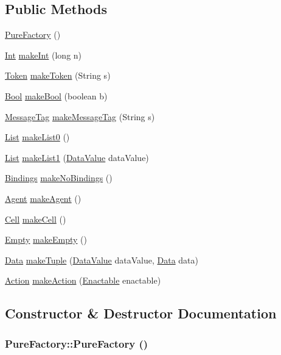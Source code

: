 \subsection*{Public Methods}
\begin{CompactItemize}
\item 
\hyperlink{classPureFactory_a0}{Pure\-Factory} ()
\item 
\hyperlink{interfaceInt}{Int} \hyperlink{classPureFactory_a1}{make\-Int} (long n)
\item 
\hyperlink{interfaceToken}{Token} \hyperlink{classPureFactory_a2}{make\-Token} (String s)
\item 
\hyperlink{interfaceBool}{Bool} \hyperlink{classPureFactory_a3}{make\-Bool} (boolean b)
\item 
\hyperlink{interfaceMessageTag}{Message\-Tag} \hyperlink{classPureFactory_a4}{make\-Message\-Tag} (String s)
\item 
\hyperlink{interfaceList}{List} \hyperlink{classPureFactory_a5}{make\-List0} ()
\item 
\hyperlink{interfaceList}{List} \hyperlink{classPureFactory_a6}{make\-List1} (\hyperlink{interfaceDataValue}{Data\-Value} data\-Value)
\item 
\hyperlink{interfaceBindings}{Bindings} \hyperlink{classPureFactory_a7}{make\-No\-Bindings} ()
\item 
\hyperlink{interfaceAgent}{Agent} \hyperlink{classPureFactory_a8}{make\-Agent} ()
\item 
\hyperlink{interfaceCell}{Cell} \hyperlink{classPureFactory_a9}{make\-Cell} ()
\item 
\hyperlink{interfaceEmpty}{Empty} \hyperlink{classPureFactory_a10}{make\-Empty} ()
\item 
\hyperlink{interfaceData}{Data} \hyperlink{classPureFactory_a11}{make\-Tuple} (\hyperlink{interfaceDataValue}{Data\-Value} data\-Value, \hyperlink{interfaceData}{Data} data)
\item 
\hyperlink{interfaceAction}{Action} \hyperlink{classPureFactory_a12}{make\-Action} (\hyperlink{interfaceEnactable}{Enactable} enactable)
\end{CompactItemize}


\subsection{Constructor \& Destructor Documentation}
\hypertarget{classPureFactory_a0}{
\subsubsection[PureFactory]{\setlength{\rightskip}{0pt plus 5cm}Pure\-Factory::Pure\-Factory ()}}
\label{classPureFactory_a0}




